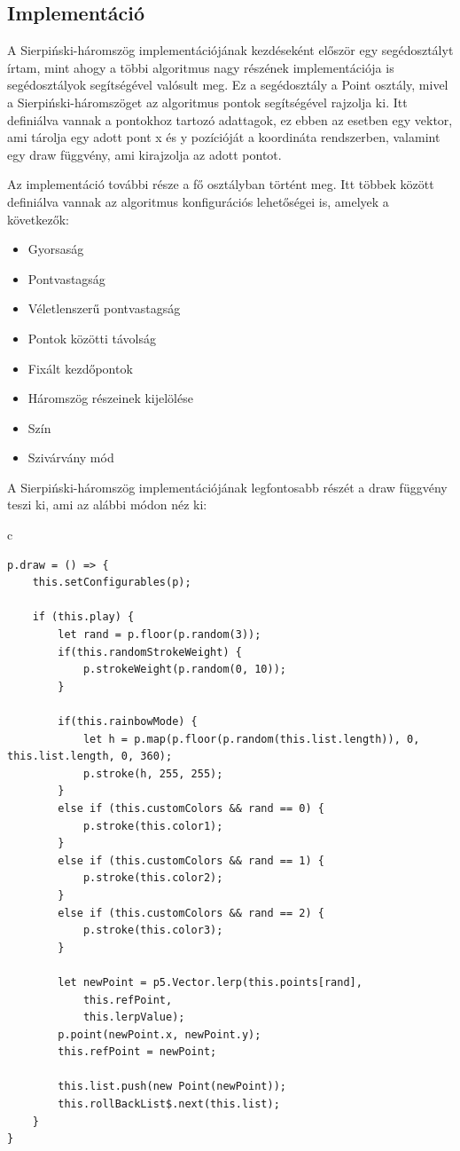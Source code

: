 \subsection*{Implementáció}
A Sierpiński-háromszög implementációjának kezdéseként először egy segédosztályt írtam, mint ahogy a többi algoritmus nagy részének implementációja is segédosztályok segítségével valósult meg. Ez a segédosztály a Point osztály, mivel a Sierpiński-háromszöget az algoritmus pontok segítségével rajzolja ki. Itt definiálva vannak a pontokhoz tartozó adattagok, ez ebben az esetben egy vektor, ami tárolja egy adott pont x és y pozícióját a koordináta rendszerben, valamint egy draw függvény, ami kirajzolja az adott pontot.
\par Az implementáció további része a fő osztályban történt meg. Itt többek között definiálva vannak az algoritmus konfigurációs lehetőségei is, amelyek a következők:
\begin{itemize}
	\item Gyorsaság
	\item Pontvastagság
	\item Véletlenszerű pontvastagság
	\item Pontok közötti távolság
	\item Fixált kezdőpontok
	\item Háromszög részeinek kijelölése
	\item Szín
	\item Szivárvány mód
\end{itemize}
A Sierpiński-háromszög implementációjának legfontosabb részét a draw függvény teszi ki, ami az alábbi módon néz ki:
\begin{center}
\begin{tabular}{c}
\begin{lstlisting}
p.draw = () => {
	this.setConfigurables(p);
	
	if (this.play) {
		let rand = p.floor(p.random(3));
		if(this.randomStrokeWeight) {
			p.strokeWeight(p.random(0, 10));
		}
	
		if(this.rainbowMode) {
			let h = p.map(p.floor(p.random(this.list.length)), 0, this.list.length, 0, 360);
			p.stroke(h, 255, 255);
		}
		else if (this.customColors && rand == 0) {
			p.stroke(this.color1);
		} 
		else if (this.customColors && rand == 1) {
			p.stroke(this.color2);
		} 
		else if (this.customColors && rand == 2) {
			p.stroke(this.color3);
		} 
	
		let newPoint = p5.Vector.lerp(this.points[rand], 
			this.refPoint, 
			this.lerpValue);
		p.point(newPoint.x, newPoint.y);
		this.refPoint = newPoint;
		
		this.list.push(new Point(newPoint));
		this.rollBackList$.next(this.list);
	}
}	
\end{lstlisting}
\end{tabular}
\end{center}
